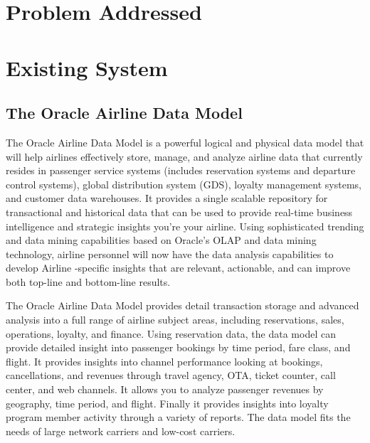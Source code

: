 \section{Problem Addressed}



\section{Existing System}



\subsection{The  Oracle Airline Data Model} 
The  Oracle  Airline Data Model is a powerful logical and physical data model that will help  airlines effectively store, manage, and analyze airline data that currently resides in passenger service systems (includes
reservation systems and departure control systems), global distribution system (GDS), loyalty management systems, and customer data warehouses.  It provides a single scalable repository for transactional and historical data 
that can be used to provide real-time business intelligence and strategic 
insights you’re  your airline. Using sophisticated trending and data mining capabilities based on Oracle’s  OLAP and data mining technology,  airline personnel will now have the data analysis  capabilities to develop Airline -specific insights that are relevant, actionable, and can improve both top-line and bottom-line results. 

The Oracle Airline Data Model provides detail transaction storage and advanced analysis into a full range of airline
subject areas, including reservations, sales, operations, loyalty, 
and finance.  Using reservation data, the data model can provide detailed insight into passenger bookings by time period, fare class, and flight.  It provides insights into channel performance looking at bookings, cancellations, and revenues through travel agency, OTA, ticket counter, call center, and web channels.  It allows you to analyze passenger 
revenues by geography, time period, and flight.  Finally it provides insights into loyalty program member activity through a variety of reports.  
The data model fits the needs of large network carriers and low-cost carriers. 

 





